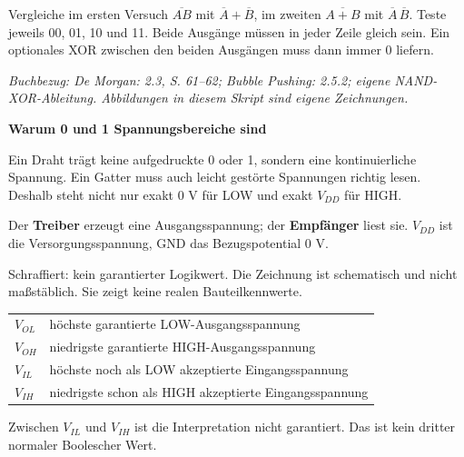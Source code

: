 \documentclass[10pt,a4paper]{article}
\newcommand{\titlepagepart}[2]{\vspace*{-4mm}{\sffamily\small #1}\par{\sffamily\LARGE\bfseries #2}\par\vspace{2mm}}
\newcommand{\block}[1]{\par\vspace{2mm}{\sffamily\large\bfseries #1}\par}
\newcommand{\source}[1]{\par{\footnotesize\itshape Buchbezug: #1. Abbildungen in diesem Skript sind eigene Zeichnungen.}}
\begin{document}
\block{Zwei Nachweise in deiner Übung}
Vergleiche im ersten Versuch $\overline{AB}$ mit $\overline A+\overline B$,
im zweiten $\overline{A+B}$ mit $\overline A\,\overline B$.
Teste jeweils 00, 01, 10 und 11. Beide Ausgänge müssen in jeder Zeile gleich sein.
Ein optionales XOR zwischen den beiden Ausgängen muss dann immer 0 liefern.
\source{De Morgan: 2.3, S. 61--62; Bubble Pushing: 2.5.2; eigene NAND-XOR-Ableitung}

\newpage
\titlepagepart{06 / DIE ELEKTRISCHE SEITE}{Warum 0 und 1 Spannungsbereiche sind}
Ein Draht trägt keine aufgedruckte 0 oder 1, sondern eine kontinuierliche
Spannung. Ein Gatter muss auch leicht gestörte Spannungen richtig lesen.
Deshalb steht nicht nur exakt 0 V für LOW und exakt $V_{DD}$ für HIGH.

\block{Treiber und Empfänger unterscheiden}
Der \textbf{Treiber} erzeugt eine Ausgangsspannung; der \textbf{Empfänger} liest sie.
$V_{DD}$ ist die Versorgungsspannung, GND das Bezugspotential 0 V.
\begin{center}
\end{center}
Schraffiert: kein garantierter Logikwert. Die Zeichnung ist schematisch und
nicht maßstäblich. Sie zeigt keine realen Bauteilkennwerte.
\begin{center}
\begin{tabular}{ll}\toprule
$V_{OL}$&höchste garantierte LOW-Ausgangsspannung\\
$V_{OH}$&niedrigste garantierte HIGH-Ausgangsspannung\\
$V_{IL}$&höchste noch als LOW akzeptierte Eingangsspannung\\
$V_{IH}$&niedrigste schon als HIGH akzeptierte Eingangsspannung\\\bottomrule
\end{tabular}
\end{center}
Zwischen $V_{IL}$ und $V_{IH}$ ist die Interpretation nicht garantiert.
Das ist kein dritter normaler Boolescher Wert.
\end{document}
